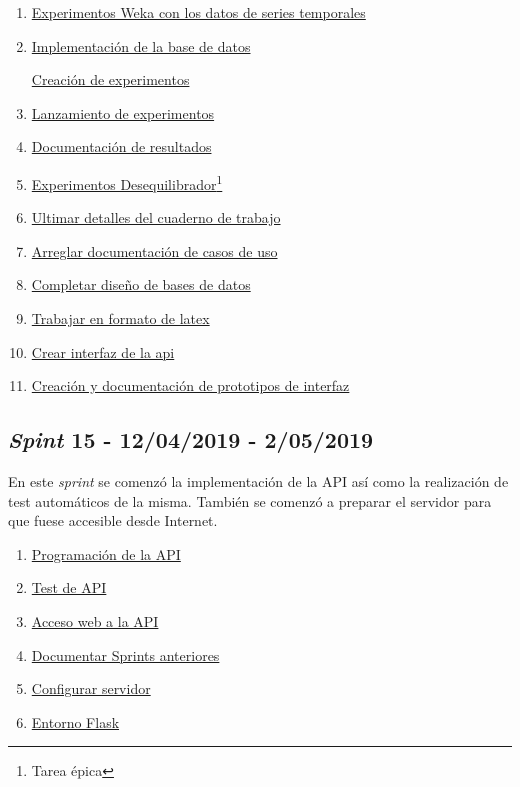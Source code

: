\begin{enumerate}\addtocounter{enumi}{50}
	\item
	\href{https://github.com/jlgarridol/TFG-SmartBeds/issues/51}{Experimentos Weka con los datos de series temporales}
	\addtocounter{enumi}{3}
	\item
	\href{https://github.com/jlgarridol/TFG-SmartBeds/issues/55}{Implementación de la base de datos}
	\addtocounter{enumi}{2}
	\href{https://github.com/jlgarridol/TFG-SmartBeds/issues/58}{Creación de experimentos}
	\item
	\href{https://github.com/jlgarridol/TFG-SmartBeds/issues/59}{Lanzamiento de experimentos}
	\item
	\href{https://github.com/jlgarridol/TFG-SmartBeds/issues/60}{Documentación de resultados}
	\item
	\href{https://github.com/jlgarridol/TFG-SmartBeds/issues/61}{Experimentos Desequilibrador\footnote{Tarea épica}}
	\item
	\href{https://github.com/jlgarridol/TFG-SmartBeds/issues/62}{Ultimar detalles del cuaderno de trabajo}
	\item
	\href{https://github.com/jlgarridol/TFG-SmartBeds/issues/63}{Arreglar documentación de casos de uso}
	\item
	\href{https://github.com/jlgarridol/TFG-SmartBeds/issues/64}{Completar diseño de bases de datos}
	\item
	\href{https://github.com/jlgarridol/TFG-SmartBeds/issues/65}{Trabajar en formato de latex}
	\item 
	\href{https://github.com/jlgarridol/TFG-SmartBeds/issues/66}{Crear interfaz de la api}
	\item 
	\href{https://github.com/jlgarridol/TFG-SmartBeds/issues/67}{Creación y documentación de prototipos de interfaz}
\end{enumerate}

\subsection{\textit{Spint} 15 - 12/04/2019 - 2/05/2019 }
En este \textit{sprint} se comenzó la implementación de la API así como la realización de test automáticos de la misma. También se comenzó a preparar el servidor para que fuese accesible desde Internet.

\begin{enumerate}\addtocounter{enumi}{67}
	\item 
	\href{https://github.com/jlgarridol/TFG-SmartBeds/issues/68}{Programación de la API}
	\item 
	\href{https://github.com/jlgarridol/TFG-SmartBeds/issues/69}{Test de API}
	\item 
	\href{https://github.com/jlgarridol/TFG-SmartBeds/issues/70}{Acceso web a la API}
	\item 
	\href{https://github.com/jlgarridol/TFG-SmartBeds/issues/71}{Documentar Sprints anteriores}
	\item 
	\href{https://github.com/jlgarridol/TFG-SmartBeds/issues/72}{Configurar servidor}
	\item 
	\href{https://github.com/jlgarridol/TFG-SmartBeds/issues/73}{Entorno Flask}
\end{enumerate}

